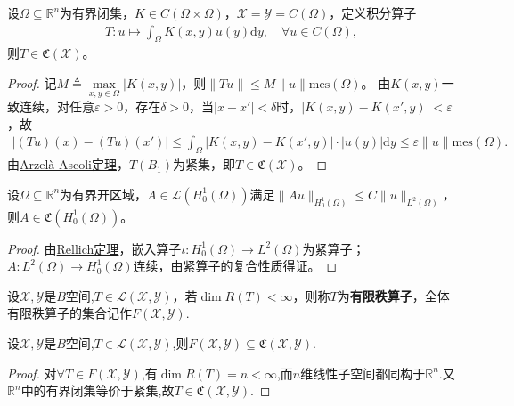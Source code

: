 \documentclass[../../main.tex]{subfiles}%
\begin{document}
\begin{example}
设$\Omega\subseteq\mathbb{R}^n$为有界闭集，$K\in C(\Omega\times\Omega)$，$\mathscr{X}=\mathscr{Y}=C(\Omega)$，定义积分算子
\begin{align*}
T:u\mapsto\int_{\Omega}K(x,y)u(y)\mathrm{d}y,\quad \forall u\in C(\Omega),
\end{align*}
则$T\in\mathfrak{C}(\mathscr{X})$。
\end{example}
\begin{proof}

记$M\triangleq\max\limits_{x,y\in\Omega}|K(x,y)|$，则$\|Tu\|\leqslant M\|u\|\mathrm{mes}(\Omega)$。
由$K(x,y)$一致连续，对任意$\varepsilon>0$，存在$\delta>0$，当$|x-x'|<\delta$时，$|K(x,y)-K(x',y)|<\varepsilon$，故
\begin{align*}
|(Tu)(x)-(Tu)(x')|\leqslant\int_{\Omega}|K(x,y)-K(x',y)|\cdot|u(y)|\mathrm{d}y\leqslant\varepsilon\|u\|\mathrm{mes}(\Omega).
\end{align*}
由\hyperref[theorem:泛函分析--Arzelà-Ascoli定理]{Arzelà-Ascoli定理}，$\overline{T(B_1)}$为紧集，即$T\in\mathfrak{C}(\mathscr{X})$。

\end{proof}

\begin{example}
设$\Omega\subseteq\mathbb{R}^n$为有界开区域，$A\in\mathscr{L}(H_0^1(\Omega))$满足$\|Au\|_{H_0^1(\Omega)}\leqslant C\|u\|_{L^2(\Omega)}$，则$A\in\mathfrak{C}(H_0^1(\Omega))$。
\end{example}
\begin{proof}

由\hyperref[theorem:Rellich定理]{Rellich定理}，嵌入算子$\iota:H_0^1(\Omega)\to L^2(\Omega)$为紧算子；$A:L^2(\Omega)\to H_0^1(\Omega)$连续，由紧算子的复合性质得证。
\end{proof}

\begin{definition}[有限秩算子]
设$\mathscr{X},\mathscr{Y}$是$B$空间,$T\in\mathscr{L}(\mathscr{X},\mathscr{Y})$，若$\dim R(T)<\infty$，则称$T$为\textbf{有限秩算子}，全体有限秩算子的集合记作$F(\mathscr{X},\mathscr{Y})$.
\end{definition}

\begin{proposition}
设$\mathscr{X},\mathscr{Y}$是$B$空间,$T\in\mathscr{L}(\mathscr{X},\mathscr{Y})$,则$F(\mathscr{X},\mathscr{Y})\subseteq\mathfrak{C}(\mathscr{X},\mathscr{Y})$.
\end{proposition}
\begin{proof}

对$\forall T\in F(\mathscr{X},\mathscr{Y})$,有$\dim R(T)=n<\infty$,而$n$维线性子空间都同构于$\mathbb{R}^n$.又$\mathbb{R}^n$中的有界闭集等价于紧集,故$T\in \mathfrak{C}(\mathscr{X},\mathscr{Y})$.
\end{proof}
\end{document}
